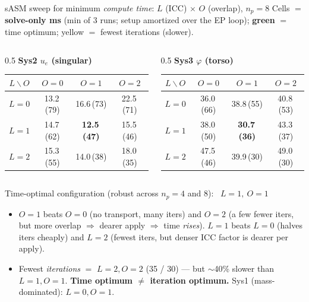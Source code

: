 \documentclass[aspectratio=169,11pt]{beamer}
\begin{document}
\begin{frame}{sASM sweep for minimum \emph{compute time}: $L$ (ICC) $\times$ $O$ (overlap), $n_p{=}8$}
Cells $=$ \textbf{solve-only ms} (min of 3 runs; setup amortized over the EP loop); \textbf{\textcolor{good}{green}} $=$ time optimum; \colorbox{yellow!35}{yellow} $=$ fewest iterations (slower).
\vspace{0.2em}
\begin{columns}[T]
\begin{column}{0.5\textwidth}\centering
\textbf{Sys2 $u_e$ (singular)} \\[0.2em]
\scriptsize
\begin{tabular}{@{}c|ccc@{}}
\toprule
$L\backslash O$ & $O{=}0$ & $O{=}1$ & $O{=}2$ \\
\midrule
$L{=}0$ & 13.2\,(79) & 16.6\,(73) & 22.5\,(71) \\
$L{=}1$ & 14.7\,(62) & \textbf{\textcolor{good}{12.5\,(47)}} & 15.5\,(46) \\
$L{=}2$ & 15.3\,(55) & 14.0\,(38) & \colorbox{yellow!35}{18.0\,(35)} \\
\bottomrule
\end{tabular}
\end{column}
\begin{column}{0.5\textwidth}\centering
\textbf{Sys3 $\varphi$ (torso)} \\[0.2em]
\scriptsize
\begin{tabular}{@{}c|ccc@{}}
\toprule
$L\backslash O$ & $O{=}0$ & $O{=}1$ & $O{=}2$ \\
\midrule
$L{=}0$ & 36.0\,(66) & 38.8\,(55) & 40.8\,(53) \\
$L{=}1$ & 38.0\,(50) & \textbf{\textcolor{good}{30.7\,(36)}} & 43.3\,(37) \\
$L{=}2$ & 47.5\,(46) & 39.9\,(30) & \colorbox{yellow!35}{49.0\,(30)} \\
\bottomrule
\end{tabular}
\end{column}
\end{columns}
\vspace{0.3em}
\begin{block}{Time-optimal configuration (robust across $n_p{=}4$ and $8$): \ $\boxed{L{=}1,\ O{=}1}$}
\footnotesize
\begin{itemize}\itemsep1pt
\item \textbf{$O{=}1$} beats $O{=}0$ (no transport, many iters) and $O{=}2$ (a few fewer iters, but more overlap $\Rightarrow$ dearer apply $\Rightarrow$ time \emph{rises}). \textbf{$L{=}1$} beats $L{=}0$ (halves iters cheaply) and $L{=}2$ (fewest iters, but denser ICC factor is dearer per apply).
\item Fewest \emph{iterations} $=$ $L{=}2,O{=}2$ (35 / 30) --- but $\sim$40\% slower than $L{=}1,O{=}1$. \textbf{Time optimum $\ne$ iteration optimum.} Sys1 (mass-dominated): $L{=}0,O{=}1$.
\end{itemize}
\end{block}
\end{frame}
\end{document}
